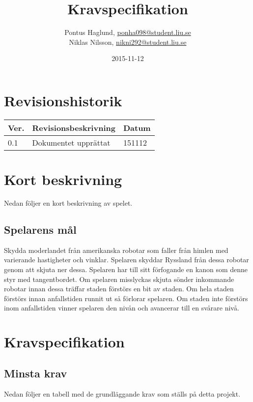 \documentclass{TDP003mall}
\author{Pontus Haglund, \url{ponha098@student.liu.se}\\
  Niklas Nilsson, \url{nikni292@student.liu.se}}
\title{Kravspecifikation}
\date{2015-11-12}
\begin{document}
\projectpage

\tableofcontents
\newpage

\section{Revisionshistorik}
\begin{table}[!h]
\begin{tabularx}{\linewidth}{|l|X|l|}
\hline
Ver. & Revisionsbeskrivning & Datum \\\hline
0.1 & Dokumentet upprättat & 151112 \\\hline
\end{tabularx}
\end{table}


\section{Kort beskrivning}
Nedan följer en kort beskrivning av spelet.

\subsection{Spelarens mål}
Skydda moderlandet från amerikanska robotar som faller från himlen med varierande hastigheter och vinklar. Spelaren skyddar Ryssland från dessa robotar genom att skjuta ner dessa. Spelaren har till sitt förfogande en kanon som denne styr med tangentbordet. Om spelaren misslyckas skjuta sönder inkommande robotar innan dessa träffar staden förstörs en bit av staden. Om hela staden förstörs innan anfallstiden runnit ut så förlorar spelaren. Om staden inte förstörs inom anfallstiden vinner spelaren den nivån och avancerar till en svårare nivå.


\section{Kravspecifikation}
\subsection{Minsta krav}
Nedan följer en tabell med de grundläggande krav som ställs på detta projekt.
\end{document}
